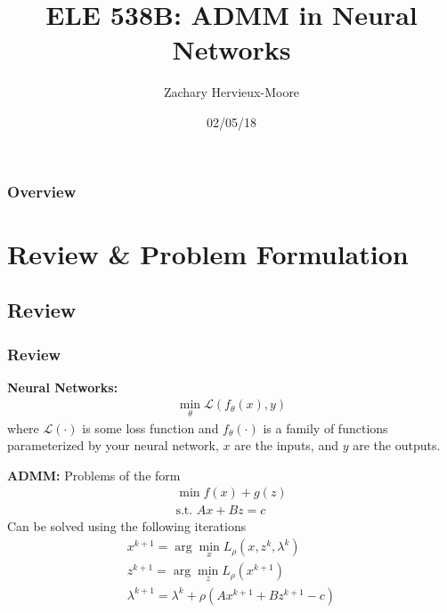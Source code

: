 \documentclass{beamer}
\title[Short title]{ELE 538B: ADMM in Neural Networks} %
\author{Zachary Hervieux-Moore} %
\date{02/05/18} %
\begin{document}
\begin{frame}
\titlepage %
\end{frame}

\begin{frame}
\frametitle{Overview} %
\tableofcontents %
\end{frame}


\section{Review \& Problem Formulation} %

\subsection{Review} %

\begin{frame}
\frametitle{Review}
\textbf{Neural Networks: }
  \begin{gather*}
    \min_{\theta} \mathcal{L}(f_\theta(x), y)
  \end{gather*}
  where $\mathcal{L}(\cdot)$ is some loss function and $f_\theta(\cdot)$ is a family of functions parameterized by your neural network, $x$ are the inputs, and $y$ are the outputs.

\textbf{ADMM: }
  Problems of the form
  \begin{gather*}
    \min f(x) + g(z) \\
    \text{s.t. } Ax + Bz = c
  \end{gather*}
  Can be solved using the following iterations
  \begin{gather*}
    x^{k+1} = \arg\min_x L_\rho (x, z^k, \lambda^k) \\
    z^{k+1} = \arg\min_z L_\rho (x^{k+1}) \\
    \lambda^{k+1} = \lambda^k + \rho (A x^{k+1} + B z^{k+1} - c)
  \end{gather*}

\end{frame}
\end{document}
